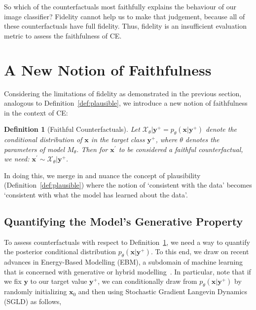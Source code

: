 \documentclass{article}
\newtheorem{definition}{Definition}[section]
\begin{document}
So which of the counterfactuals most faithfully explains the behaviour of our image classifier? Fidelity cannot help us to make that judgement, because all of these counterfactuals have full fidelity. Thus, fidelity is an insufficient evaluation metric to assess the faithfulness of CE. 

\section{A New Notion of Faithfulness}\label{faithfulness}

Considering the limitations of fidelity as demonstrated in the previous section, analogous to Definition~\ref{def:plausible}, we introduce a new notion of faithfulness in the context of CE:

\begin{definition}[Faithful Counterfactuals]
  \label{def:faithful}
  Let $\mathcal{X}_{\theta}|\mathbf{y}^+ = p_{\theta}(\mathbf{x}|\mathbf{y}^+)$ denote the conditional distribution of $\mathbf{x}$ in the target class $\mathbf{y}^+$, where $\theta$ denotes the parameters of model $M_{\theta}$. Then for $\mathbf{x}^{\prime}$ to be considered a faithful counterfactual, we need: $\mathbf{x}^{\prime} \sim \mathcal{X}_{\theta}|\mathbf{y}^+$.
\end{definition}

In doing this, we merge in and nuance the concept of plausibility (Definition~\ref{def:plausible}) where the notion of `consistent with the data' becomes `consistent with what the model has learned about the data'.

\subsection{Quantifying the Model's Generative Property}

To assess counterfactuals with respect to Definition~\ref{def:faithful}, we need a way to quantify the posterior conditional distribution $p_{\theta}(\mathbf{x}|\mathbf{y}^+)$. To this end, we draw on recent advances in Energy-Based Modelling (EBM), a subdomain of machine learning that is concerned with generative or hybrid modelling~\citep{grathwohl2020your,du2020implicit}. In particular, note that if we fix $\mathbf{y}$ to our target value $\mathbf{y}^+$, we can conditionally draw from $p_{\theta}(\mathbf{x}|\mathbf{y}^+)$ by randomly initializing $\mathbf{x}_0$ and then using Stochastic Gradient Langevin Dynamics (SGLD) as follows, 
\end{document}

